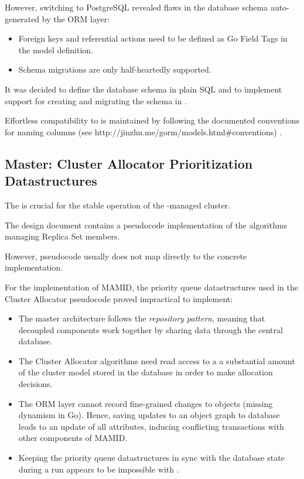 However, switching to PostgreSQL revealed flaws in the database schema auto-generated by the  ORM layer:

\begin{itemize}
\item Foreign keys and referential actions need to be defined as Go Field Tags in the model definition.
\item Schema migrations are only half-heartedly supported.
\end{itemize}

It was decided to define the database schema in plain SQL and to implement support for creating and migrating the schema in \mamid. %

Effortless compatibility to  is maintained by following the documented conventions for naming columns (see http://jinzhu.me/gorm/models.html\#conventions) .

\subsection{Master: Cluster Allocator Prioritization Datastructures}

The  is crucial for the stable operation of the \mamid-managed cluster.

The design document contains a pseudocode implementation of the  algorithms managing Replica Set members.

However, pseudocode usually does not map directly to the concrete implementation.

For the implementation of MAMID, the priority queue datastructures used in the Cluster Allocator pseudocode proved impractical to implement:

\begin{itemize}
\item The master architecture follows the \textit{repository pattern}, meaning that decoupled components work together by sharing data
through the central database.
\item The Cluster Allocator algorithms need read access to a a substantial amount of the cluster model stored in the database
      in order to make allocation decisions.
\item The  ORM layer cannot record fine-grained changes to objects (missing dynamism in Go).
      Hence, saving updates to an object graph to database leads to an update of all attributes,
      inducing conflicting transactions with other components of MAMID.
\item Keeping the priority queue datastructures in sync with the database state during a  run
      appears to be impossible with .
\end{itemize}

